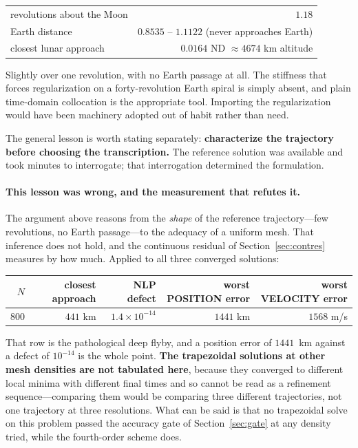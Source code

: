 \documentclass[11pt]{article}
\begin{document}
\begin{table}[h]
\centering\small
\begin{tabular}{lr}
\toprule
revolutions about the Moon & $1.18$ \\
Earth distance & $0.8535$ -- $1.1122$ (never approaches Earth) \\
closest lunar approach & $0.0164$ ND $\approx 4674$ km altitude \\
\bottomrule
\end{tabular}
\end{table}

Slightly over one revolution, with no Earth passage at all. The stiffness that
forces regularization on a forty-revolution Earth spiral is simply absent, and
plain time-domain collocation is the appropriate tool. Importing the
regularization would have been machinery adopted out of habit rather than need.

The general lesson is worth stating separately: \textbf{characterize the
trajectory before choosing the transcription.} The reference solution was
available and took minutes to interrogate; that interrogation determined the
formulation.

\paragraph{This lesson was wrong, and the measurement that refutes it.} The
argument above reasons from the \emph{shape} of the reference trajectory---few
revolutions, no Earth passage---to the adequacy of a uniform mesh. That
inference does not hold, and the continuous residual of
Section~\ref{sec:contres} measures by how much. Applied to all three converged
solutions:

\begin{table}[h]
\centering\small
\begin{tabular}{rrrrr}
\toprule
$N$ & closest approach & NLP defect & worst POSITION error & worst VELOCITY error \\
\midrule
$800$  & $441$ km  & $1.4\times10^{-14}$ & $1441$ km & $1568$ m/s \\
\bottomrule
\end{tabular}
\end{table}

That row is the pathological deep flyby, and a position error of $1441$~km
against a defect of $10^{-14}$ is the whole point. \textbf{The trapezoidal
solutions at other mesh densities are not tabulated here}, because they converged
to different local minima with different final times and so cannot be read as a
refinement sequence---comparing them would be comparing three different
trajectories, not one trajectory at three resolutions. What can be said is that
no trapezoidal solve on this problem passed the accuracy gate of
Section~\ref{sec:gate} at any density tried, while the fourth-order scheme does.
\end{document}
